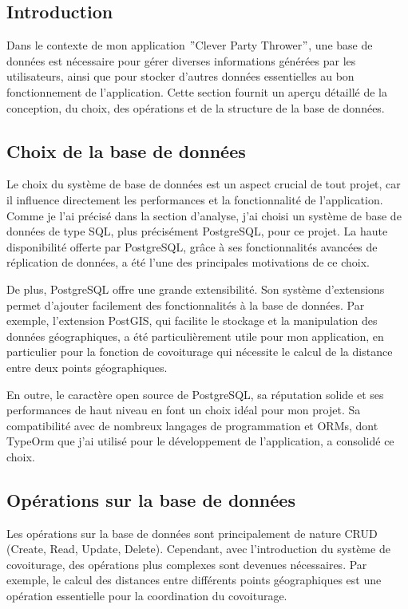 \subsection{Introduction}\label{subsec:introduction_base_de_donnee}
Dans le contexte de mon application \("\)Clever Party Thrower\("\), une base de données est nécessaire pour gérer diverses informations générées par les utilisateurs,
ainsi que pour stocker d'autres données essentielles au bon fonctionnement de l'application.
Cette section fournit un aperçu détaillé de la conception, du choix, des opérations et de la structure de la base de données.

\subsection{Choix de la base de données}\label{subsec:choix-de-la-base-de-donnee}
Le choix du système de base de données est un aspect crucial de tout projet, car il influence directement les performances et la fonctionnalité de l'application.
Comme je l'ai précisé dans la section d'analyse, j'ai choisi un système de base de données de type SQL, plus précisément PostgreSQL, pour ce projet.
La haute disponibilité offerte par PostgreSQL, grâce à ses fonctionnalités avancées de réplication de données, a été l'une des principales motivations de ce choix.

De plus, PostgreSQL offre une grande extensibilité.
Son système d'extensions permet d'ajouter facilement des fonctionnalités à la base de données.
Par exemple, l'extension PostGIS, qui facilite le stockage et la manipulation des données géographiques, a été particulièrement utile pour mon application,
en particulier pour la fonction de covoiturage qui nécessite le calcul de la distance entre deux points géographiques.

En outre, le caractère open source de PostgreSQL, sa réputation solide et ses performances de haut niveau en font un choix idéal pour mon projet.
Sa compatibilité avec de nombreux langages de programmation et ORMs, dont TypeOrm que j'ai utilisé pour le développement de l'application, a consolidé ce choix.

\subsection{Opérations sur la base de données}\label{subsec:operation-sur-la-base-de-donnees}
Les opérations sur la base de données sont principalement de nature CRUD (Create, Read, Update, Delete).
Cependant, avec l'introduction du système de covoiturage, des opérations plus complexes sont devenues nécessaires.
Par exemple, le calcul des distances entre différents points géographiques est une opération essentielle pour la coordination du covoiturage.

